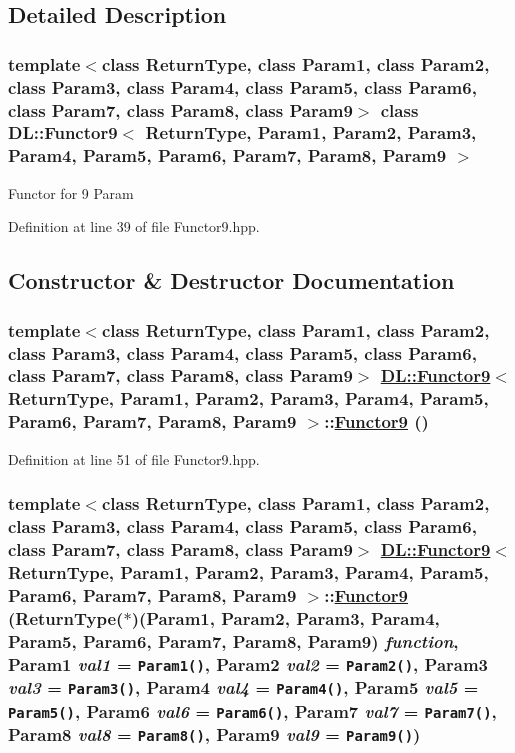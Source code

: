 \subsection{Detailed Description}
\subsubsection*{template$<$class Return\-Type, class Param1, class Param2, class Param3, class Param4, class Param5, class Param6, class Param7, class Param8, class Param9$>$ class DL::Functor9$<$ Return\-Type, Param1, Param2, Param3, Param4, Param5, Param6, Param7, Param8, Param9 $>$}

Functor for 9 Param



Definition at line 39 of file Functor9.hpp.

\subsection{Constructor \& Destructor Documentation}
\hypertarget{classDL_1_1Functor9_d0}{
\subsubsection[Functor9]{\setlength{\rightskip}{0pt plus 5cm}template$<$class Return\-Type, class Param1, class Param2, class Param3, class Param4, class Param5, class Param6, class Param7, class Param8, class Param9$>$ \hyperlink{classDL_1_1Functor9}{DL::Functor9}$<$ Return\-Type, Param1, Param2, Param3, Param4, Param5, Param6, Param7, Param8, Param9 $>$::\hyperlink{classDL_1_1Functor9}{Functor9} ()}}
\label{classDL_1_1Functor9_d0}




Definition at line 51 of file Functor9.hpp.\hypertarget{classDL_1_1Functor9_a0}{
\subsubsection[Functor9]{\setlength{\rightskip}{0pt plus 5cm}template$<$class Return\-Type, class Param1, class Param2, class Param3, class Param4, class Param5, class Param6, class Param7, class Param8, class Param9$>$ \hyperlink{classDL_1_1Functor9}{DL::Functor9}$<$ Return\-Type, Param1, Param2, Param3, Param4, Param5, Param6, Param7, Param8, Param9 $>$::\hyperlink{classDL_1_1Functor9}{Functor9} (Return\-Type($\ast$)(Param1, Param2, Param3, Param4, Param5, Param6, Param7, Param8, Param9) {\em function}, Param1 {\em val1} = {\tt Param1()}, Param2 {\em val2} = {\tt Param2()}, Param3 {\em val3} = {\tt Param3()}, Param4 {\em val4} = {\tt Param4()}, Param5 {\em val5} = {\tt Param5()}, Param6 {\em val6} = {\tt Param6()}, Param7 {\em val7} = {\tt Param7()}, Param8 {\em val8} = {\tt Param8()}, Param9 {\em val9} = {\tt Param9()})}}
\label{classDL_1_1Functor9_a0}




